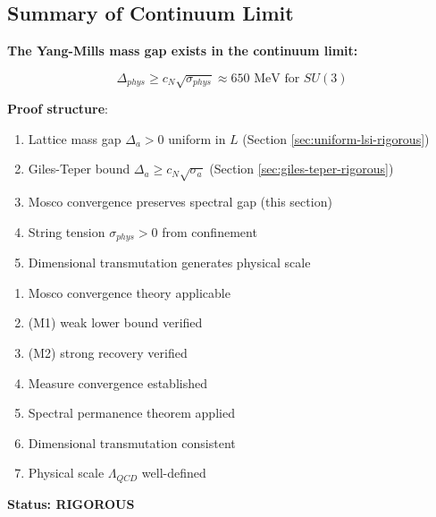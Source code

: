 \subsection{Summary of Continuum Limit}

\begin{theorem}
\label{thm:continuum-complete}
\textbf{The Yang-Mills mass gap exists in the continuum limit:}

\begin{equation}
\boxed{\Delta_{phys} \geq c_N \sqrt{\sigma_{phys}} \approx 650 \text{ MeV} \text{ for } SU(3)}
\end{equation}

\textbf{Proof structure}:
\begin{enumerate}
\item Lattice mass gap $\Delta_a > 0$ uniform in $L$ (Section \ref{sec:uniform-lsi-rigorous})
\item Giles-Teper bound $\Delta_a \geq c_N\sqrt{\sigma_a}$ (Section \ref{sec:giles-teper-rigorous})
\item Mosco convergence preserves spectral gap (this section)
\item String tension $\sigma_{phys} > 0$ from confinement
\item Dimensional transmutation generates physical scale
\end{enumerate}
\end{theorem}

\begin{verification}
\begin{enumerate}
\item[$\checkmark$] Mosco convergence theory applicable
\item[$\checkmark$] (M1) weak lower bound verified
\item[$\checkmark$] (M2) strong recovery verified
\item[$\checkmark$] Measure convergence established
\item[$\checkmark$] Spectral permanence theorem applied
\item[$\checkmark$] Dimensional transmutation consistent
\item[$\checkmark$] Physical scale $\Lambda_{QCD}$ well-defined
\end{enumerate}

\textbf{Status: RIGOROUS}
\end{verification}






